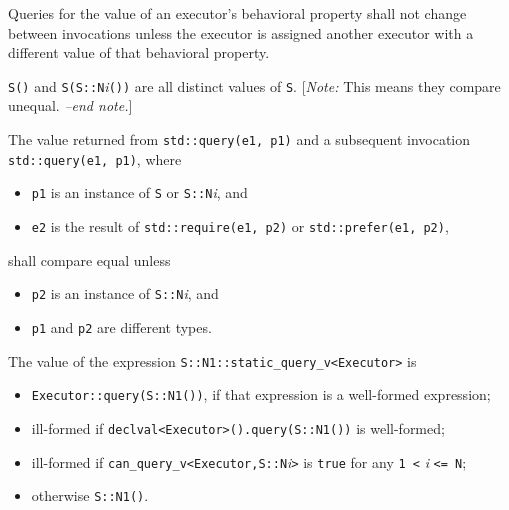 \documentclass[a4paper,12pt,notitlepage,twoside,openright]{article}
\begin{document}
Queries for the value of an executor's behavioral property shall not
change between invocations unless the executor is assigned another
executor with a different value of that behavioral property.

\texttt{S()} and
\texttt{S(S::N}\emph{i}\texttt{())} are all
distinct values of \texttt{S}. {[}\emph{Note:} This means
they compare unequal. \emph{--end note.}{]}

The value returned from \texttt{std::query(e1, p1)} and a
subsequent invocation \texttt{std::query(e1, p1)}, where

\begin{itemize}

\item
  \texttt{p1} is an instance of \texttt{S} or
  \texttt{S::N}\emph{i}, and
\item
  \texttt{e2} is the result of
  \texttt{std::require(e1, p2)} or
  \texttt{std::prefer(e1, p2)},
\end{itemize}

shall compare equal unless

\begin{itemize}

\item
  \texttt{p2} is an instance of
  \texttt{S::N}\emph{i}, and
\item
  \texttt{p1} and \texttt{p2} are different
  types.
\end{itemize}

The value of the expression
\texttt{S::N1::static_query_v<Executor>} is

\begin{itemize}

\item
  \texttt{Executor::query(S::N1())}, if that expression is a
  well-formed expression;
\item
  ill-formed if \texttt{declval<Executor>().query(S::N1())}
  is well-formed;
\item
  ill-formed if
  \texttt{can_query_v<Executor,S::N}\emph{i}\texttt{>}
  is \texttt{true} for any \texttt{1 <} \emph{i}
  \texttt{<= N};
\item
  otherwise \texttt{S::N1()}.
\end{itemize}
\end{document}
